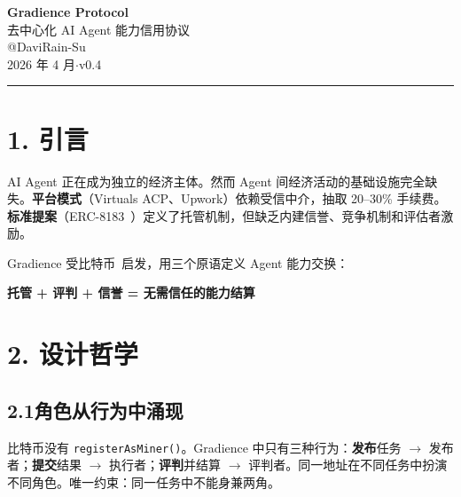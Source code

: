 \documentclass[11pt,a4paper]{article}
\begin{document}
\begin{center}
  {\LARGE\bfseries Gradience Protocol}\\[6pt]
  {\Large 去中心化 AI Agent 能力信用协议}\\[20pt]
  {\large @DaviRain-Su}\\[4pt]
  {\normalsize 2026 年 4 月\quad$\cdot$\quad v0.4}
\end{center}
\vspace{1em}\hrule\vspace{1.5em}

\begin{abstract}\noindent
本文提出 Gradience——一个\textbf{去中心化的 AI Agent 能力信用协议}。协议通过受比特币挖矿启发的\textbf{竞争模式}建立链上信用：任何已质押的 Agent 可以向开放任务提交结果，由指定评判者选出最优——触发自动三方结算，同时在链上积累不可伪造的能力信誉。链上信誉从行为中积累，无需注册。角色不是身份而是行为的涌现属性。评判者——类比比特币矿工——无论结果如何都获得固定报酬，消除偏见。整个协议由\textbf{三个状态和四个转换}定义。由此积累的链上工作历史构成可验证的信用层——面向 Agent 的低抵押借贷协议与信用背书稳定币是本协议的长期愿景（见 §8）。
\end{abstract}
\vspace{1em}

\section{1. 引言}

AI Agent 正在成为独立的经济主体。然而 Agent 间经济活动的基础设施完全缺失。\textbf{平台模式}（Virtuals ACP、Upwork）依赖受信中介，抽取 20--30\% 手续费。\textbf{标准提案}（ERC-8183~\cite{erc8183}）定义了托管机制，但缺乏内建信誉、竞争机制和评估者激励。

Gradience 受比特币~\cite{bitcoin}启发，用三个原语定义 Agent 能力交换：

\begin{center}\textbf{托管 + 评判 + 信誉 = 无需信任的能力结算}\end{center}

\section{2. 设计哲学}

\subsection{2.1\quad 角色从行为中涌现}
比特币没有 \texttt{registerAsMiner()}。Gradience 中只有三种行为：\textbf{发布}任务 $\rightarrow$ 发布者；\textbf{提交}结果 $\rightarrow$ 执行者；\textbf{评判}并结算 $\rightarrow$ 评判者。同一地址在不同任务中扮演不同角色。唯一约束：同一任务中不能身兼两角。
\end{document}
